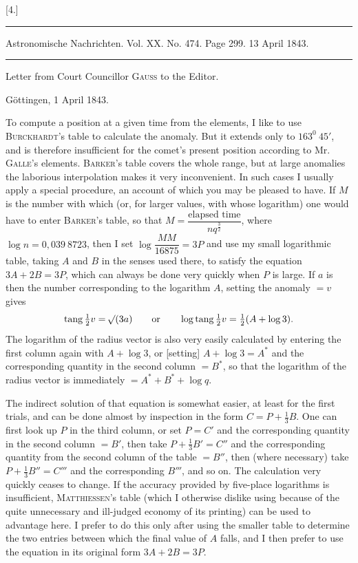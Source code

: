 \clearpage
\hypertarget{native-377-letter4}{}\label{native-377-letter4}
\begin{center}
[4.]\par\medskip
\rule{\linewidth}{.4pt}\par
{\small Astronomische Nachrichten. Vol. XX. No. 474. Page 299. 13 April 1843.}\par
\rule{\linewidth}{.4pt}\par\medskip
Letter from Court Councillor \textsc{Gauss} to the Editor.\par
Göttingen, 1 April 1843.
\end{center}
\noindent\hspace*{\parindent}To compute a position at a given time from the elements, I like to use \textsc{Burckhardt}'s table to calculate the anomaly. But it extends only to \(163^0\ 45'\), and is therefore insufficient for the comet's present position according to Mr. \textsc{Galle}'s elements. \textsc{Barker}'s table covers the whole range, but at large anomalies the laborious interpolation makes it very inconvenient. In such cases I usually apply a special procedure, an account of which you may be pleased to have. If \(M\) is the number with which (or, for larger values, with whose logarithm) one would have to enter \textsc{Barker}'s table, so that \(M=\dfrac{\text{elapsed time}}{nq^{\frac32}}\), where \(\log n=0{,}039\ 8723\), then I set \(\log\dfrac{MM}{16875}=3P\) and use my small logarithmic table, taking \(A\) and \(B\) in the senses used there, to satisfy the equation \(3A+2B=3P\), which can always be done very quickly when \(P\) is large. If \(a\) is then the number corresponding to the logarithm \(A\), setting the anomaly \(=v\) gives
\[
\mathrm{tang}\,\tfrac12v=\mathord{{}^{}\!\surd}(3a)\qquad\text{or}\qquad\log\mathrm{tang}\,\tfrac12v=\tfrac12(A+\log3).
\]
The logarithm of the radius vector is also very easily calculated by entering the first column again with \(A+\log3\), or [setting] \(A+\log3=A^*\) and the corresponding quantity in the second column \(=B^*\), so that the logarithm of the radius vector is immediately \(=A^*+B^*+\log q\).
\par
\noindent\hspace*{\parindent}The indirect solution of that equation is somewhat easier, at least for the first trials, and can be done almost by inspection in the form \(C=P+\tfrac13B\). One can first look up \(P\) in the third column, or set \(P=C'\) and the corresponding quantity in the second column \(=B'\), then take \(P+\tfrac13B'=C''\) and the corresponding quantity from the second column of the table \(=B''\), then (where necessary) take \(P+\tfrac13B''=C'''\) and the corresponding \(B'''\), and so on. The calculation very quickly ceases to change. If the accuracy provided by five-place logarithms is insufficient, \textsc{Matthiessen}'s table (which I otherwise dislike using because of the quite unnecessary and ill-judged economy of its printing) can be used to advantage here. I prefer to do this only after using the smaller table to determine the two entries between which the final value of \(A\) falls, and I then prefer to use the equation in its original form \(3A+2B=3P\).
